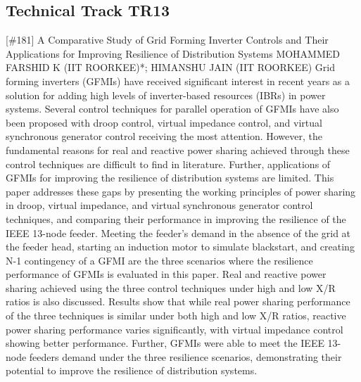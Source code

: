 \clearpage \subsection{Technical Track TR13}\nopagebreak {} \begin{abstract_online} {[\#181] A Comparative Study of Grid Forming Inverter Controls and Their Applications for Improving Resilience of Distribution Systems} {} {MOHAMMED FARSHID K (IIT ROORKEE)*; HIMANSHU JAIN (IIT ROORKEE)} {} Grid forming inverters (GFMIs) have received significant interest in recent years as a solution for adding high levels of inverter-based resources (IBRs) in power systems. Several control techniques for parallel operation of GFMIs have also been proposed with droop control, virtual impedance control, and virtual synchronous generator control receiving the most attention. However, the fundamental reasons for real and reactive power sharing achieved through these control techniques are difficult to find in literature. Further, applications of GFMIs for improving the resilience of distribution systems are limited. This paper addresses these gaps by presenting the working principles of power sharing in droop, virtual impedance, and virtual synchronous generator control techniques, and comparing their performance in improving the resilience of the IEEE 13-node feeder. Meeting the feeder's demand in the absence of the grid at the feeder head, starting an induction motor to simulate blackstart, and creating N-1 contingency of a GFMI are the three scenarios where the resilience performance of GFMIs is evaluated in this paper. Real and reactive power sharing achieved using the three control techniques under high and low X/R ratios is also discussed. Results show that while real power sharing performance of the three techniques is similar under both high and low X/R ratios, reactive power sharing performance varies significantly, with virtual impedance control showing better performance. Further, GFMIs were able to meet the IEEE 13-node feeders demand under the three resilience scenarios, demonstrating their potential to improve the resilience of distribution systems. \end{abstract_online} 
